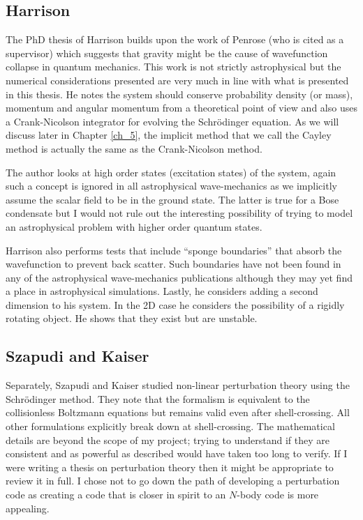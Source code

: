 \subsection{Harrison}
The PhD thesis of Harrison \citep{bib_har} builds upon the work of Penrose (who is cited as a supervisor) which suggests that gravity might be the cause of wavefunction collapse in quantum mechanics. This work is not strictly astrophysical but the numerical considerations presented are very much in line with what is presented in this thesis. He notes the system should conserve probability density (or mass), momentum and angular momentum from a theoretical point of view and also uses a Crank-Nicolson integrator for evolving the Schr\"odinger equation. As we will discuss later in Chapter \ref{ch_5}, the implicit method that we call the Cayley method is actually the same as the Crank-Nicolson method.

The author looks at high order states (excitation states) of the system, again such a concept is ignored in all astrophysical wave-mechanics as we implicitly assume the scalar field to be in the ground state. The latter is true for a Bose condensate but I would not rule out the interesting possibility of trying to model an astrophysical problem with higher order quantum states.

Harrison also performs tests that include ``sponge boundaries'' that absorb the wavefunction to prevent back scatter. Such boundaries have not been found in any of the astrophysical wave-mechanics publications although they may yet find a place in astrophysical simulations. Lastly, he considers adding a second dimension to his system. In the 2D case he considers the possibility of a rigidly rotating object. He shows that they exist but are unstable.


\subsection{Szapudi and Kaiser}
Separately, Szapudi and Kaiser \citep{bib_sk} studied non-linear perturbation theory using the Schr\"odinger method. They note that the formalism is equivalent to the collisionless Boltzmann equations but remains valid even after shell-crossing. All other formulations explicitly break down at shell-crossing. The mathematical details are beyond the scope of my project; trying to understand if they are consistent and as powerful as described would have taken too long to verify. If I were writing a thesis on perturbation theory then it might be appropriate to review it in full. I chose not to go down the path of developing a perturbation code as creating a code that is closer in spirit to an $N$-body code is more appealing.

